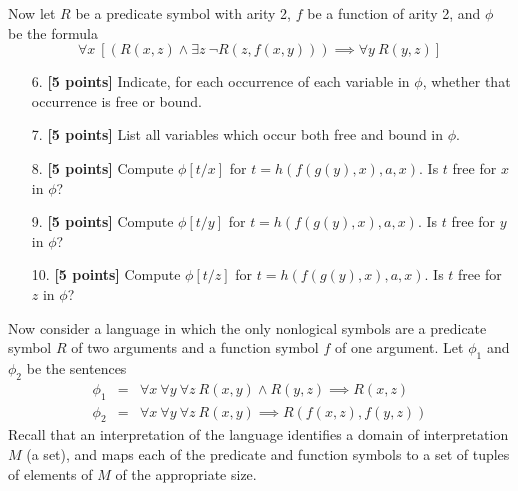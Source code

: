 \documentclass{article}
\begin{document}
\noindent
Now let $R$ be a predicate symbol with arity 2, $f$ be a function of
arity 2, and $\phi$ be the formula
\begin{displaymath}
  \forall x\
  [(R(x,z) \land  \exists z\ \neg R(z,f(x,y)))
  \implies \forall y\ R(y,z)]
\end{displaymath}
  
\begin{enumerate}
\item[6.] \textbf{[5 points]} Indicate, for each occurrence of each
  variable in $\phi$, whether that occurrence is free or bound.
\end{enumerate}

\begin{enumerate}
\item[7.] \textbf{[5 points]} List all variables which occur both free and
  bound in $\phi$.
\end{enumerate}

\begin{enumerate}
\item[8.] \textbf{[5 points]} Compute $\phi[t/x]$ for
  $t = h(f(g(y),x),a,x)$.  Is $t$ free for $x$ in $\phi$?
\end{enumerate}

\begin{enumerate}
\item[9.] \textbf{[5 points]} Compute $\phi[t/y]$ for
  $t = h(f(g(y),x),a,x)$.  Is $t$ free for $y$ in $\phi$?
\end{enumerate}

\begin{enumerate}
\item[10.] \textbf{[5 points]} Compute $\phi[t/z]$ for
  $t = h(f(g(y),x),a,x)$.  Is $t$ free for $z$ in $\phi$?
\end{enumerate}

\noindent
Now consider a language in which the only nonlogical symbols are a
predicate symbol $R$ of two arguments and a function symbol $f$ of one
argument.  Let $\phi_1$ and $\phi_2$ be the sentences
\begin{eqnarray*}
  \phi_1 
  & =
  & \forall x\ \forall y\ \forall z\
    R(x,y) \land R(y,z) \implies R(x,z) 
  \\
  \phi_2
  & = 
  & \forall x\ \forall y\ \forall z\
    R(x,y) \implies R(f(x,z),f(y,z))
\end{eqnarray*}
Recall that an interpretation of the language identifies a domain of
interpretation $M$ (a set), and maps each of the predicate and
function symbols to a set of tuples of elements of $M$ of the
appropriate size.
\end{document}
